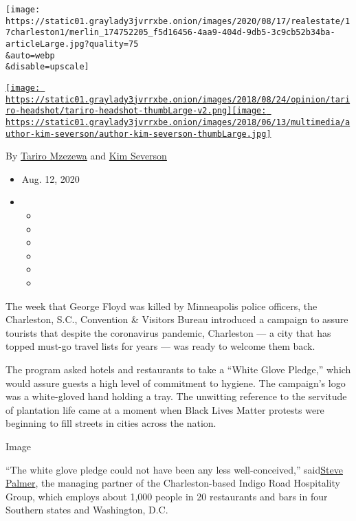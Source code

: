\texttt{[image: https://static01.graylady3jvrrxbe.onion/images/2020/08/17/realestate/17charleston1/merlin\_174752205\_f5d16456-4aa9-404d-9db5-3c9cb52b34ba-articleLarge.jpg?quality=75\\\&auto=webp\\\&disable=upscale]}

\href{https://www.nytimes3xbfgragh.onion/by/tariro-mzezewa}{\texttt{[image: https://static01.graylady3jvrrxbe.onion/images/2018/08/24/opinion/tariro-headshot/tariro-headshot-thumbLarge-v2.png]}}\href{https://www.nytimes3xbfgragh.onion/by/kim-severson}{\texttt{[image: https://static01.graylady3jvrrxbe.onion/images/2018/06/13/multimedia/author-kim-severson/author-kim-severson-thumbLarge.jpg]}}

By \href{https://www.nytimes3xbfgragh.onion/by/tariro-mzezewa}{Tariro
Mzezewa} and
\href{https://www.nytimes3xbfgragh.onion/by/kim-severson}{Kim Severson}

\begin{itemize}
\item
  Aug. 12, 2020
\item
  \begin{itemize}
  \item
  \item
  \item
  \item
  \item
  \item
  \end{itemize}
\end{itemize}

The week that George Floyd was killed by Minneapolis police officers,
the Charleston, S.C., Convention \& Visitors Bureau introduced a
campaign to assure tourists that despite the coronavirus pandemic,
Charleston --- a city that has topped must-go travel lists for years ---
was ready to welcome them back.

The program asked hotels and restaurants to take a ``White Glove
Pledge,'' which would assure guests a high level of commitment to
hygiene. The campaign's logo was a white-gloved hand holding a tray. The
unwitting reference to the servitude of plantation life came at a moment
when Black Lives Matter protests were beginning to fill streets in
cities across the nation.

Image

``The white glove pledge could not have been any less well-conceived,''
said\href{https://www.nytimes3xbfgragh.onion/2019/10/31/dining/steve-palmer-restaurant-addiction.html}{Steve
Palmer}, the managing partner of the Charleston-based Indigo Road
Hospitality Group, which employs about 1,000 people in 20 restaurants
and bars in four Southern states and Washington, D.C.

